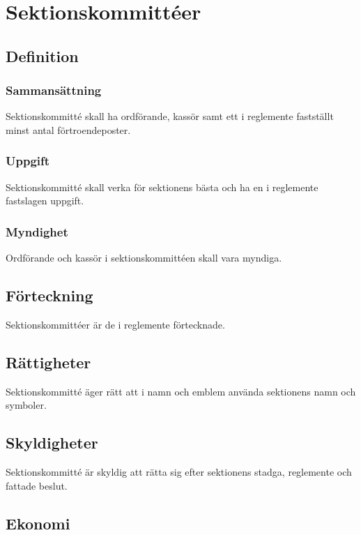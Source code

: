 \section{Sektionskommittéer}

\subsection{Definition}

\subsubsection{Sammansättning}
Sektionskommitté skall ha ordförande, kassör samt ett i reglemente fastställt minst antal förtroendeposter.

\subsubsection{Uppgift}
Sektionskommitté skall verka för sektionens bästa och ha en i reglemente fastslagen uppgift.

\subsubsection{Myndighet}
Ordförande och kassör i sektionskommittéen skall vara myndiga.

\subsection{Förteckning}

Sektionskommittéer är de i reglemente förtecknade.

\subsection{Rättigheter}

Sektionskommitté äger rätt att i namn och emblem använda sektionens namn och symboler.

\subsection{Skyldigheter}

Sektionskommitté är skyldig att rätta sig efter sektionens stadga, reglemente och fattade beslut.

\subsection{Ekonomi}
